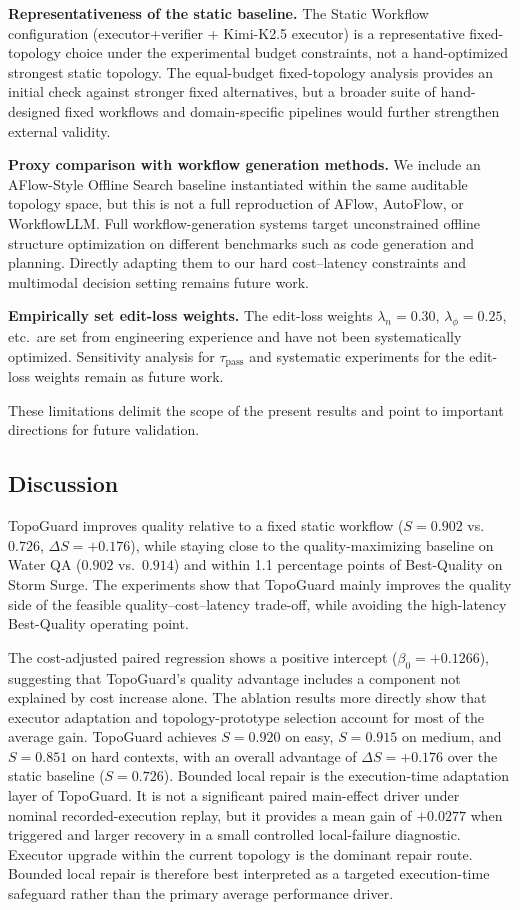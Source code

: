 \documentclass[acmsmall,review,anonymous]{acmart}
\begin{document}
\textbf{Representativeness of the static baseline.} The Static Workflow configuration (executor+verifier + Kimi-K2.5 executor) is a representative fixed-topology choice under the experimental budget constraints, not a hand-optimized strongest static topology. The equal-budget fixed-topology analysis provides an initial check against stronger fixed alternatives, but a broader suite of hand-designed fixed workflows and domain-specific pipelines would further strengthen external validity.

\textbf{Proxy comparison with workflow generation methods.} We include an AFlow-Style Offline Search baseline instantiated within the same auditable topology space, but this is not a full reproduction of AFlow, AutoFlow, or WorkflowLLM. Full workflow-generation systems target unconstrained offline structure optimization on different benchmarks such as code generation and planning. Directly adapting them to our hard cost--latency constraints and multimodal decision setting remains future work.

\textbf{Empirically set edit-loss weights.} The edit-loss weights $\lambda_n=0.30$, $\lambda_\phi=0.25$, etc.\ are set from engineering experience and have not been systematically optimized. Sensitivity analysis for $\tau_{\mathrm{pass}}$ and systematic experiments for the edit-loss weights remain as future work.

These limitations delimit the scope of the present results and point to important directions for future validation.

\subsection{Discussion}
\label{subsec:discussion}

TopoGuard improves quality relative to a fixed static workflow ($S=0.902$ vs.\ $0.726$, $\Delta S=+0.176$), while staying close to the quality-maximizing baseline on Water QA ($0.902$ vs.\ $0.914$) and within 1.1 percentage points of Best-Quality on Storm Surge. The experiments show that TopoGuard mainly improves the quality side of the feasible quality--cost--latency trade-off, while avoiding the high-latency Best-Quality operating point.

The cost-adjusted paired regression shows a positive intercept ($\beta_0=+0.1266$), suggesting that TopoGuard's quality advantage includes a component not explained by cost increase alone. The ablation results more directly show that executor adaptation and topology-prototype selection account for most of the average gain. TopoGuard achieves $S=0.920$ on easy, $S=0.915$ on medium, and $S=0.851$ on hard contexts, with an overall advantage of $\Delta S=+0.176$ over the static baseline ($S=0.726$). Bounded local repair is the execution-time adaptation layer of TopoGuard. It is not a significant paired main-effect driver under nominal recorded-execution replay, but it provides a mean gain of $+0.0277$ when triggered and larger recovery in a small controlled local-failure diagnostic. Executor upgrade within the current topology is the dominant repair route. Bounded local repair is therefore best interpreted as a targeted execution-time safeguard rather than the primary average performance driver.
\end{document}
